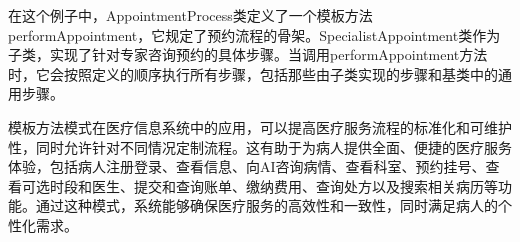 在这个例子中，AppointmentProcess类定义了一个模板方法performAppointment，它规定了预约流程的骨架。SpecialistAppointment类作为子类，实现了针对专家咨询预约的具体步骤。当调用performAppointment方法时，它会按照定义的顺序执行所有步骤，包括那些由子类实现的步骤和基类中的通用步骤。

模板方法模式在医疗信息系统中的应用，可以提高医疗服务流程的标准化和可维护性，同时允许针对不同情况定制流程。这有助于为病人提供全面、便捷的医疗服务体验，包括病人注册登录、查看信息、向AI咨询病情、查看科室、预约挂号、查看可选时段和医生、提交和查询账单、缴纳费用、查询处方以及搜索相关病历等功能。通过这种模式，系统能够确保医疗服务的高效性和一致性，同时满足病人的个性化需求。

